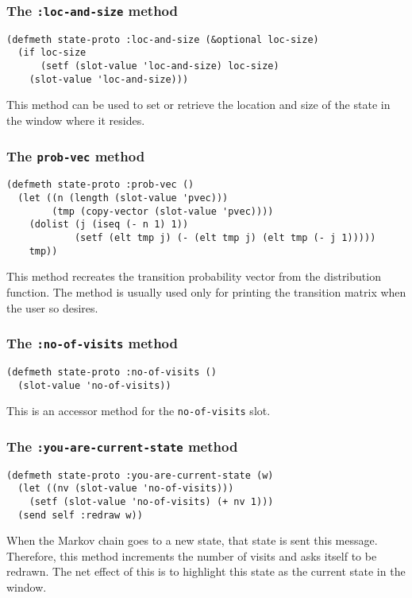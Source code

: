 \subsubsection{The {\tt :loc-and-size} method}
\label{subsubsec:states-loc-and-size}
\begin{verbatim}
(defmeth state-proto :loc-and-size (&optional loc-size)
  (if loc-size
      (setf (slot-value 'loc-and-size) loc-size)
    (slot-value 'loc-and-size)))
\end{verbatim}
This method can be used to set or retrieve the location and size of
the state in the window where it resides.

\subsubsection{The {\tt prob-vec} method}
\label{subsubsec:prob-vec}
\begin{verbatim}
(defmeth state-proto :prob-vec ()
  (let ((n (length (slot-value 'pvec)))
        (tmp (copy-vector (slot-value 'pvec))))
    (dolist (j (iseq (- n 1) 1))
            (setf (elt tmp j) (- (elt tmp j) (elt tmp (- j 1)))))
    tmp))
\end{verbatim}
This method recreates the transition probability vector from the
distribution function.  The method is usually used only for
printing the transition matrix when the user so desires.


\subsubsection{The {\tt :no-of-visits} method}
\label{subsubsec:no-of-visits}
\begin{verbatim}
(defmeth state-proto :no-of-visits ()
  (slot-value 'no-of-visits))
\end{verbatim}
This is an accessor method for the {\tt no-of-visits} slot.

\subsubsection{The {\tt :you-are-current-state} method}
\label{subsubsec:you-are-current-state}
\begin{verbatim}
(defmeth state-proto :you-are-current-state (w)
  (let ((nv (slot-value 'no-of-visits)))
    (setf (slot-value 'no-of-visits) (+ nv 1)))
  (send self :redraw w))
\end{verbatim}
When the Markov chain goes to a new state, that state is sent this
message.  Therefore, this method increments the number of visits and
asks itself to be redrawn. The net effect of this is to highlight this
state as the current state in the window.


